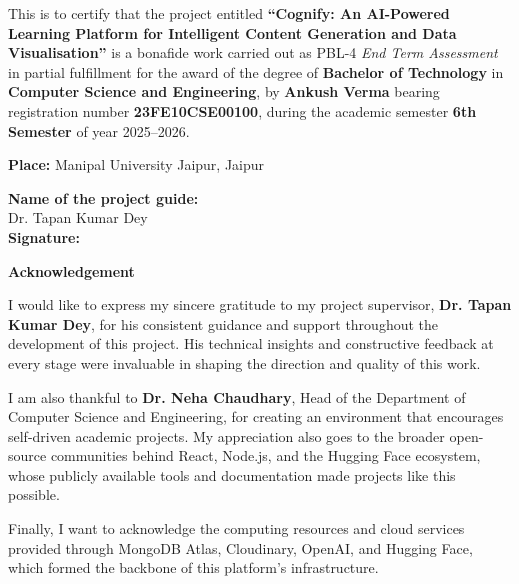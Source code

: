 \documentclass[12pt,a4paper]{article}
\newcommand{\ProjectTitle}{Cognify: An AI-Powered Learning Platform for Intelligent Content Generation and Data Visualisation}
\newcommand{\StudentName}{Ankush Verma}
\newcommand{\RegNo}{23FE10CSE00100}
\newcommand{\Semester}{6th Semester}
\newcommand{\Department}{Department of Computer Science and Engineering}
\newcommand{\Supervisor}{Dr. Tapan Kumar Dey}
\begin{document}
This is to certify that the project entitled \textbf{``\ProjectTitle''} is a bonafide work carried out as PBL-4 \textit{End Term Assessment} in partial fulfillment for the award of the degree of \textbf{Bachelor of Technology} in \textbf{Computer Science and Engineering}, by \textbf{\StudentName} bearing registration number \textbf{\RegNo}, during the academic semester \textbf{\Semester} of year 2025--2026.

\vspace{2cm}

\noindent
\begin{minipage}[t]{0.45\textwidth}
\textbf{Place:} Manipal University Jaipur, Jaipur
\end{minipage}%
\begin{minipage}[t]{0.5\textwidth}
\begin{flushright}
\textbf{Name of the project guide:}\\[0.2cm]
\Supervisor\\[1.5cm]
\textbf{Signature:}\\[0.2cm]
\underline{\hspace{5cm}}
\end{flushright}
\end{minipage}
\clearpage

\begin{center}
{\Large \textbf{Acknowledgement}}
\end{center}
\vspace{0.8cm}

I would like to express my sincere gratitude to my project supervisor, \textbf{\Supervisor}, for his consistent guidance and support throughout the development of this project. His technical insights and constructive feedback at every stage were invaluable in shaping the direction and quality of this work.

I am also thankful to \textbf{Dr. Neha Chaudhary}, Head of the \Department, for creating an environment that encourages self-driven academic projects. My appreciation also goes to the broader open-source communities behind React, Node.js, and the Hugging Face ecosystem, whose publicly available tools and documentation made projects like this possible.

Finally, I want to acknowledge the computing resources and cloud services provided through MongoDB Atlas, Cloudinary, OpenAI, and Hugging Face, which formed the backbone of this platform's infrastructure.
\end{document}
